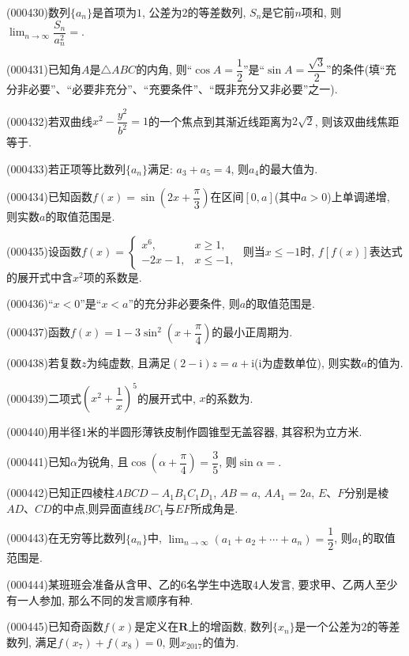\item (000430)数列$\{a_n\}$是首项为$1$, 公差为$2$的等差数列, $S_n$是它前$n$项和, 则$\displaystyle\lim_{n\to\infty}\dfrac{S_n}{a_n^2}=$.
\item (000431)已知角$A$是$\triangle ABC$的内角, 则``$\cos A=\dfrac12$''是``$\sin A=\dfrac{\sqrt3}2$''的条件(填``充分非必要''、``必要非充分''、``充要条件''、``既非充分又非必要''之一).
\item (000432)若双曲线$x^2-\dfrac{y^2}{b^2}=1$的一个焦点到其渐近线距离为$2\sqrt2$, 则该双曲线焦距等于.
\item (000433)若正项等比数列$\{a_n\}$满足: $a_3+a_5=4$, 则$a_4$的最大值为.
\item (000434)已知函数$f(x)=\sin (2x+\dfrac\pi 3)$在区间$[0,a]$(其中$a>0$)上单调递增, 则实数$a$的取值范围是.
\item (000435)设函数$f(x)=\begin{cases}    x^6, & x\ge 1,  \\   -2x-1, & x\le -1, \end{cases}$ 则当$x\le -1$时, $f[f(x)]$表达式的展开式中含${x^2}$项的系数是.
\item (000436)``$x<0$''是``$x<a$''的充分非必要条件, 则$a$的取值范围是.
\item (000437)函数$f(x)=1-3\sin ^2(x+\dfrac\pi 4)$的最小正周期为.
\item (000438)若复数$z$为纯虚数, 且满足$(2-\mathrm{i})z=a+\mathrm{i}$($\mathrm{i}$为虚数单位), 则实数$a$的值为.
\item (000439)二项式$(x^2+\dfrac 1x)^5$的展开式中, $x$的系数为.
\item (000440)用半径$1$米的半圆形薄铁皮制作圆锥型无盖容器, 其容积为立方米.
\item (000441)已知$\alpha$为锐角, 且$\cos (\alpha +\dfrac\pi 4)=\dfrac35$, 则$\sin \alpha =$.
\item (000442)已知正四棱柱$ABCD-A_1B_1C_1D_1$, $AB=a$, $AA_1=2a$, $E$、$F$分别是棱$AD$、$CD$的中点,则异面直线$BC_1$与$EF$所成角是.
\item (000443)在无穷等比数列$\{a_n\}$中, $\displaystyle\lim_{n\to\infty}(a_1+a_2+\cdots+a_n)=\dfrac12$, 则$a_1$的取值范围是.
\item (000444)某班班会准备从含甲、乙的$6$名学生中选取$4$人发言, 要求甲、乙两人至少有一人参加, 那么不同的发言顺序有种.
\item (000445)已知奇函数$f(x)$是定义在$\mathbf{R}$上的增函数, 数列$\{x_n\}$是一个公差为$2$的等差数列, 满足$f(x_7)+f(x_8)=0$, 则$x_{2017}$的值为.
